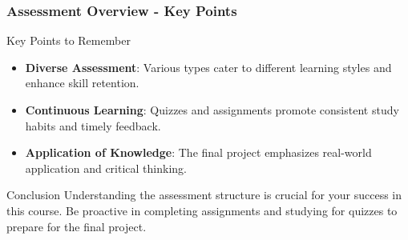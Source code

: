 \documentclass[aspectratio=169]{beamer}
\begin{document}
\begin{frame}[fragile]
    \frametitle{Assessment Overview - Key Points}
    \begin{block}{Key Points to Remember}
        \begin{itemize}
            \item \textbf{Diverse Assessment}: Various types cater to different learning styles and enhance skill retention.
            \item \textbf{Continuous Learning}: Quizzes and assignments promote consistent study habits and timely feedback.
            \item \textbf{Application of Knowledge}: The final project emphasizes real-world application and critical thinking.
        \end{itemize}
    \end{block}

    \begin{block}{Conclusion}
        Understanding the assessment structure is crucial for your success in this course. Be proactive in completing assignments and studying for quizzes to prepare for the final project.
    \end{block}
\end{frame}
\end{document}
